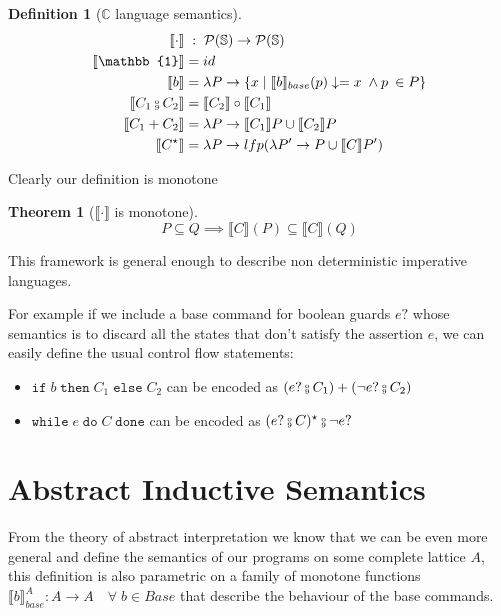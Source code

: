 \documentclass{article}
\newtheorem{definition}{Definition}
\newtheorem{theorem}{Theorem}
\def\rr{\rightarrow}
\newcommand*{\sem}[1]{
    \llbracket #1 \rrbracket
}
\newcommand{\basesem}[2][A]{
    \sem{#2}_{base}
}
\newcommand{\pow}[1]{
    \mathcal{P}(#1)
}
\def\fcmp{\mathbin{\raise 0.6ex\hbox{\oalign{\hfil$\scriptscriptstyle      
    \mathrm{o}$\hfil\cr\hfil$\scriptscriptstyle\mathrm{9}$\hfil}}}}
\def\rr{\rightarrow}
\def\lang{\mathbb{C}}
\def\state{\mathbb{S}}
\begin{document}
    \begin{definition}[$\lang$ language semantics]
        \label{def:deno}
        \begin{align*}
            \sem{\cdot}         & \;:\; \pow{\state} \rr \pow{\state} \\
            \sem{\mathbb{1}}    &= id \\
            \sem{b}             &= \lambda P \rr \{ x 
                \mid \basesem{b}(p)\downarrow = x \; \land p \: \in P \} \\
            \sem{C_1 \fcmp C_2} &= \sem{C_2} \circ \sem{C_1} \\
            \sem{C_1 + C_2}     &= \lambda P \rr \sem{C_1} P \cup \sem{C_2} P \\
            \sem{C^\star}       &= \lambda P \rr lfp(\lambda P' \rr
                P \cup \sem{C} P')
        \end{align*}
    \end{definition}

    Clearly our definition is monotone
    \begin{theorem}[$\sem{\cdot}$ is monotone]
        $$P \subseteq Q \implies \sem{C}(P) \subseteq \sem{C}(Q)$$
    \end{theorem}

    This framework is general enough to describe non deterministic imperative 
    languages. 

    For example if we include a base command for boolean guards $e?$ whose
    semantics is to discard all the states that don't satisfy the assertion $e$,
    we can easily define the usual control flow statements:
    \begin{itemize}
        \item $\texttt{if} \; b \; \texttt{then} \; C_1 \; \texttt{else} \; C_2$ 
            can be encoded as $(e ? \fcmp C_1) + (\neg e ? \fcmp C_2)$
        \item $\texttt{while} \; e \; \texttt{do} \; C \; \texttt{done}$
            can be encoded as $(e? \fcmp C)^\star \fcmp \neg e ?$
    \end{itemize}

\section{Abstract Inductive Semantics}

From the theory of abstract interpretation we know that we can be even more
general and define the semantics of our programs on some complete lattice $A$, 
this definition is also parametric on a family of monotone functions 
$\basesem{b}^A : A \rightarrow A \quad \forall \; b \in Base$ that describe the
behaviour of the base commands.
\end{document}
